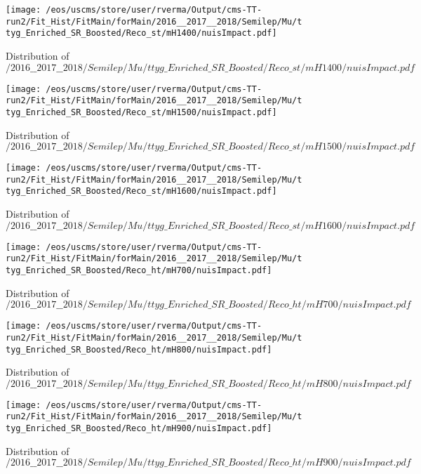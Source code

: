 \begin{figure}
\centering
\texttt{[image: /eos/uscms/store/user/rverma/Output/cms-TT-run2/Fit\_Hist/FitMain/forMain/2016\_\_2017\_\_2018/Semilep/Mu/ttyg\_Enriched\_SR\_Boosted/Reco\_st/mH1400/nuisImpact.pdf]}
\caption{Distribution of $/2016\_\_2017\_\_2018/Semilep/Mu/ttyg\_Enriched\_SR\_Boosted/Reco\_st/mH1400/nuisImpact.pdf$}
\end{figure}

\begin{figure}
\centering
\texttt{[image: /eos/uscms/store/user/rverma/Output/cms-TT-run2/Fit\_Hist/FitMain/forMain/2016\_\_2017\_\_2018/Semilep/Mu/ttyg\_Enriched\_SR\_Boosted/Reco\_st/mH1500/nuisImpact.pdf]}
\caption{Distribution of $/2016\_\_2017\_\_2018/Semilep/Mu/ttyg\_Enriched\_SR\_Boosted/Reco\_st/mH1500/nuisImpact.pdf$}
\end{figure}

\begin{figure}
\centering
\texttt{[image: /eos/uscms/store/user/rverma/Output/cms-TT-run2/Fit\_Hist/FitMain/forMain/2016\_\_2017\_\_2018/Semilep/Mu/ttyg\_Enriched\_SR\_Boosted/Reco\_st/mH1600/nuisImpact.pdf]}
\caption{Distribution of $/2016\_\_2017\_\_2018/Semilep/Mu/ttyg\_Enriched\_SR\_Boosted/Reco\_st/mH1600/nuisImpact.pdf$}
\end{figure}

\begin{figure}
\centering
\texttt{[image: /eos/uscms/store/user/rverma/Output/cms-TT-run2/Fit\_Hist/FitMain/forMain/2016\_\_2017\_\_2018/Semilep/Mu/ttyg\_Enriched\_SR\_Boosted/Reco\_ht/mH700/nuisImpact.pdf]}
\caption{Distribution of $/2016\_\_2017\_\_2018/Semilep/Mu/ttyg\_Enriched\_SR\_Boosted/Reco\_ht/mH700/nuisImpact.pdf$}
\end{figure}

\begin{figure}
\centering
\texttt{[image: /eos/uscms/store/user/rverma/Output/cms-TT-run2/Fit\_Hist/FitMain/forMain/2016\_\_2017\_\_2018/Semilep/Mu/ttyg\_Enriched\_SR\_Boosted/Reco\_ht/mH800/nuisImpact.pdf]}
\caption{Distribution of $/2016\_\_2017\_\_2018/Semilep/Mu/ttyg\_Enriched\_SR\_Boosted/Reco\_ht/mH800/nuisImpact.pdf$}
\end{figure}

\begin{figure}
\centering
\texttt{[image: /eos/uscms/store/user/rverma/Output/cms-TT-run2/Fit\_Hist/FitMain/forMain/2016\_\_2017\_\_2018/Semilep/Mu/ttyg\_Enriched\_SR\_Boosted/Reco\_ht/mH900/nuisImpact.pdf]}
\caption{Distribution of $/2016\_\_2017\_\_2018/Semilep/Mu/ttyg\_Enriched\_SR\_Boosted/Reco\_ht/mH900/nuisImpact.pdf$}
\end{figure}

